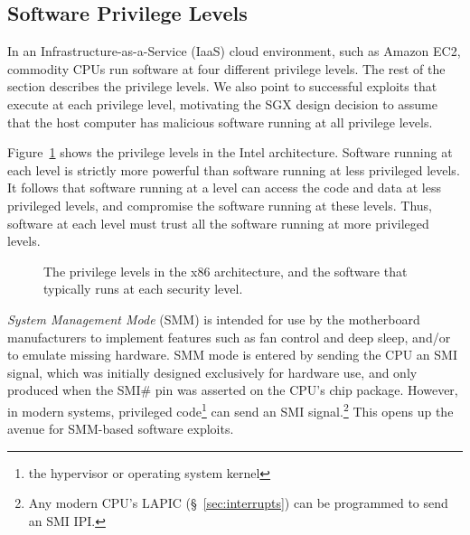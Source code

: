 \subsection{Software Privilege Levels}
\label{sec:rings}

In an Infrastructure-as-a-Service (IaaS) cloud environment, such as Amazon EC2,
commodity CPUs run software at four different privilege levels. The rest of the
section describes the privilege levels. We also point to successful exploits
that execute at each privilege level, motivating the SGX design decision to
assume that the host computer has malicious software running at all privilege
levels.

Figure~\ref{fig:cpu_rings} shows the privilege levels in the Intel
architecture. Software running at each level is strictly more powerful than
software running at less privileged levels. It follows that software running at
a level can access the code and data at less privileged levels, and compromise
the software running at these levels. Thus, software at each level must trust
all the software running at more privileged levels.

\begin{figure}[hbtp]
  \caption{
    The privilege levels in the x86 architecture, and the software that
    typically runs at each security level.
  }
  \label{fig:cpu_rings}
\end{figure}


\textit{System Management Mode} (SMM) is intended for use by the motherboard
manufacturers to implement features such as fan control and deep sleep, and/or
to emulate missing hardware. SMM mode is entered by sending the CPU an SMI
signal, which was initially designed exclusively for hardware use, and only
produced when the SMI\# pin was asserted on the CPU's chip package. However, in
modern systems, privileged code\footnote{the hypervisor or operating system
kernel} can send an SMI signal.\footnote{Any modern CPU's LAPIC
(\S~\ref{sec:interrupts}) can be programmed to send an SMI IPI.}
This opens up the avenue for SMM-based software exploits.

